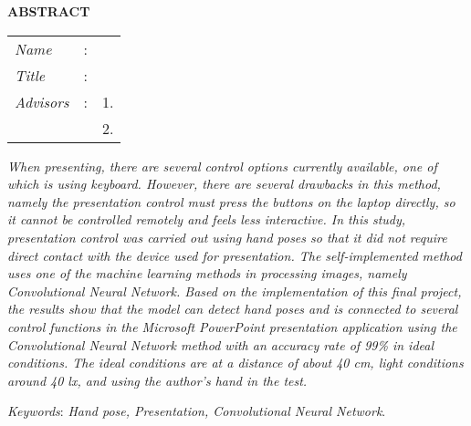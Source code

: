 \begin{center}
  \large\textbf{ABSTRACT}
\end{center}


\vspace{2ex}

\begingroup
\setlength{\tabcolsep}{0pt}

\noindent
\begin{tabularx}{\textwidth}{l >{\centering}m{3em} X}
  \emph{Name}     & : & \name{}         \\

  \emph{Title}    & : & \engtatitle{}   \\

  \emph{Advisors} & : & 1. \advisor{}   \\
                  &   & 2. \coadvisor{} \\
\end{tabularx}
\endgroup


\emph{When presenting, there are several control options currently available, one of which is using keyboard. However, there are several drawbacks in this method, namely the presentation control must press the buttons on the laptop directly, so it cannot be controlled remotely and feels less interactive. In this study, presentation control was carried out using hand poses so that it did not require direct contact with the device used for presentation. The self-implemented method uses one of the machine learning methods in processing images, namely Convolutional Neural Network. Based on the implementation of this final project, the results show that the model can detect hand poses and is connected to several control functions in the Microsoft PowerPoint presentation application using the Convolutional Neural Network method with an accuracy rate of 99\% in ideal conditions. The ideal conditions are at a distance of about 40 cm, light conditions around 40 lx, and using the author's hand in the test.}

\emph{Keywords}: \emph{Hand pose, Presentation, Convolutional Neural Network}.
